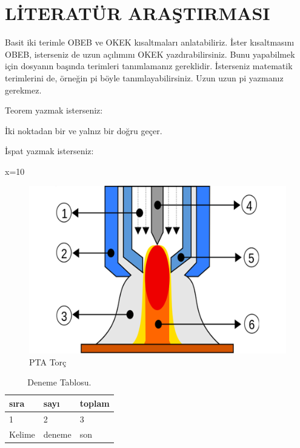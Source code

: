 \chapter{LİTERATÜR ARAŞTIRMASI}

Basit iki terimle \acrfull{OBEB} ve \acrfull{OKEK} kısaltmaları anlatabiliriz. İster kısaltmasını \acrshort{OBEB}, isterseniz de uzun açılımını \acrlong{OKEK} yazdırabilirsiniz. Bunu yapabilmek için dosyanın başında terimleri tanımlamanız gereklidir. İsterseniz matematik terimlerini de, örneğin \acrshort{pi} böyle tanımlayabilirsiniz. Uzun uzun \acrfull{pi} yazmanız gerekmez. 

Teorem yazmak isterseniz:
\begin{theorem}[Öklid]
 İki noktadan bir ve yalnız bir doğru geçer.
\end{theorem}

İspat yazmak isterseniz:
\begin{ispat}
x=10
\end{ispat}
\lipsum[1-2]
\begin{figure}[h]
\centering
\includegraphics[width=\textwidth]{gorseller/ptaTorc}
\caption{PTA Torç}\label{fig:PtaTorc1}
\end{figure}
\lipsum[1-2]
\begin{table}
\centering
\caption{Deneme Tablosu.}\label{tab:den1}
\begin{tabular}{|l|l|l|}
\hline
sıra   & sayı   & toplam \\ \hline
1      & 2      & 3      \\ \hline
Kelime & deneme & son    \\ \hline
\end{tabular}
\end{table}


